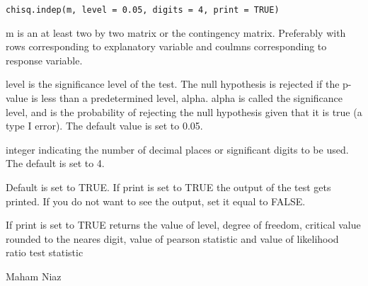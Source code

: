 \documentclass[letterpaper]{book}
\begin{document}
%
\begin{Usage}
\begin{verbatim}
chisq.indep(m, level = 0.05, digits = 4, print = TRUE)
\end{verbatim}
\end{Usage}
%
\begin{Arguments}
\begin{ldescription}
\item[\code{m}] 
m is an at least two by two matrix or the contingency matrix. Preferably with rows corresponding to explanatory variable
and coulmns corresponding to response variable.  

\item[\code{level}] 
level is the significance level of the test. 
The null hypothesis is rejected if the p-value is less than a predetermined level, alpha. 
alpha is called the significance level, and is the probability of rejecting the null hypothesis given that it is true (a type I error). 
The default value is set to 0.05. 

\item[\code{digits}] 
integer indicating the number of decimal places or significant digits to be used. The default is set to 4.  

\item[\code{print}] 
Default is set to TRUE. If print is set to TRUE the output of the test gets printed. 
If you do not want to see the output, set it equal to FALSE.

\end{ldescription}
\end{Arguments}
%
\begin{Value}
\begin{ldescription}
\item[\code{}] If print is set to TRUE returns the value of level, degree of freedom, critical value rounded to the neares digit, value of pearson statistic and value of likelihood ratio test statistic
\end{ldescription}




\end{Value}
%
\begin{Author}\relax
Maham Niaz
\end{Author}
%
\end{document}
